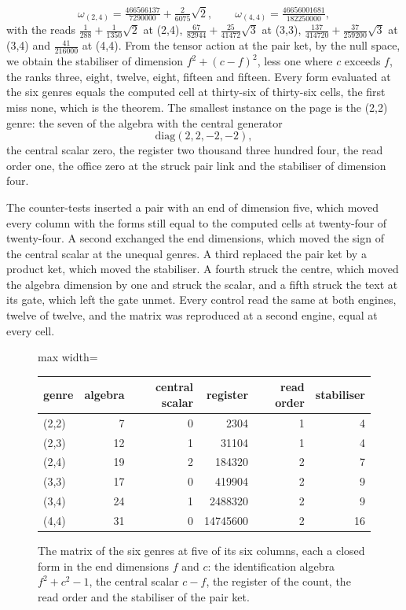 \begin{chproof}
\begin{equation}
\omega_{(2,4)} = \tfrac{466566137}{7290000} + \tfrac{2}{6075}\sqrt{2} , \qquad \omega_{(4,4)} = \tfrac{46656001681}{182250000} ,
\end{equation}
with the reads $\tfrac{1}{288} + \tfrac{1}{1350}\sqrt{2}$ at (2,4), $\tfrac{67}{82944} + \tfrac{25}{41472}\sqrt{3}$ at (3,3), $\tfrac{137}{414720} + \tfrac{37}{259200}\sqrt{3}$ at (3,4) and $\tfrac{41}{216000}$ at (4,4). From the tensor action at the pair ket, by the null space, we obtain the stabiliser of dimension $f^{2} + (c - f)^{2}$, less one where $c$ exceeds $f$, the ranks three, eight, twelve, eight, fifteen and fifteen. Every form evaluated at the six genres equals the computed cell at thirty-six of thirty-six cells, the first miss none, which is the theorem. The smallest instance on the page is the (2,2) genre: the seven of the algebra with the central generator
\begin{equation}
\mathrm{diag}(2, 2, -2, -2) ,
\end{equation}
the central scalar zero, the register two thousand three hundred four, the read order one, the office zero at the struck pair link and the stabiliser of dimension four.

The counter-tests inserted a pair with an end of dimension five, which moved every column with the forms still equal to the computed cells at twenty-four of twenty-four. A second exchanged the end dimensions, which moved the sign of the central scalar at the unequal genres. A third replaced the pair ket by a product ket, which moved the stabiliser. A fourth struck the centre, which moved the algebra dimension by one and struck the scalar, and a fifth struck the text at its gate, which left the gate unmet. Every control read the same at both engines, twelve of twelve, and the matrix was reproduced at a second engine, equal at every cell.
\end{chproof}
\begin{figure}[h]\centering
\begin{adjustbox}{max width=\linewidth}\begin{tabular}{lrrrrr}\toprule
genre & algebra & central scalar & register & read order & stabiliser \\ \midrule
(2,2) & 7 & 0 & 2304 & 1 & 4 \\
(2,3) & 12 & 1 & 31104 & 1 & 4 \\
(2,4) & 19 & 2 & 184320 & 2 & 7 \\
(3,3) & 17 & 0 & 419904 & 2 & 9 \\
(3,4) & 24 & 1 & 2488320 & 2 & 9 \\
(4,4) & 31 & 0 & 14745600 & 2 & 16 \\ \bottomrule
\end{tabular}\end{adjustbox}
\caption{The matrix of the six genres at five of its six columns, each a closed form in the end dimensions $f$ and $c$: the identification algebra $f^{2} + c^{2} - 1$, the central scalar $c - f$, the register of the count, the read order and the stabiliser of the pair ket.}
\end{figure}
